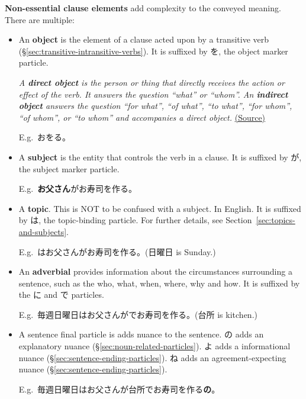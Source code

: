 \documentclass[../nihongo-gakushuu-kyouzai.tex]{subfiles}
\begin{document}
\textbf{Non-essential clause elements} add complexity to the conveyed meaning. There are multiple:
\begin{itemize}
    \item An \textbf{object} is the element of a clause acted upon by a transitive verb (\S\ref{sec:transitive-intransitive-verbs}). It is suffixed by を, the object marker particle.

    \emph{A \textbf{direct object} is the person or thing that directly receives the action or effect of the verb. It answers the question ``what'' or ``whom''.  An \textbf{indirect object} answers the question ``for what'', ``of what'', ``to what'', ``for whom'', ``of whom'', or ``to whom'' and accompanies a direct object.} \href{https://www.britannica.com/dictionary/eb/qa/Direct-and-Indirect-Objects}{(Source)}

    E.g.\ お\textbf{}をる。
    \item A \textbf{subject} is the entity that controls the verb in a clause. It is suffixed by が, the subject marker particle.

    E.g.\ \textbf{お父さん}がお寿司を作る。
    \item A \textbf{topic}. This is NOT to be confused with a subject. In English. It is suffixed by は, the topic-binding particle. For further details, see Section~\ref{sec:topics-and-subjects}.

    E.g.\ \textbf{}はお父さんがお寿司を作る。(日曜日 is Sunday.)
    \item An \textbf{adverbial} provides information about the circumstances surrounding a sentence, such as the who, what, when, where, why and how. It is suffixed by the に and で particles.

    E.g.\ 毎週日曜日はお父さんが\textbf{}でお寿司を作る。(台所 is kitchen.)

    \item A sentence final particle is adds nuance to the sentence. の adds an explanatory nuance (\S\ref{sec:noun-related-particles}). よ adds a informational nuance (\S\ref{sec:sentence-ending-particles}). ね adds an agreement-expecting nuance (\S\ref{sec:sentence-ending-particles}).

    E.g.\ 毎週日曜日はお父さんが台所でお寿司を作る\textbf{の}。
\end{itemize}
\end{document}
